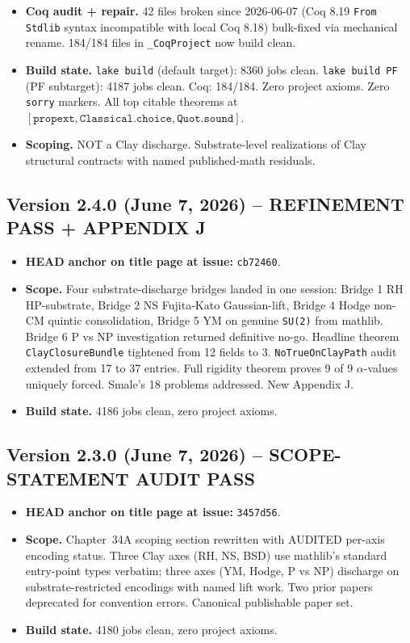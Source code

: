 \begin{itemize}
just-intonation tritones, cymatic-temple-architecture anchor.
\item \textbf{Coq audit + repair.} 42 files broken since 2026-06-07
(Coq 8.19 \texttt{From Stdlib} syntax incompatible with local Coq
8.18) bulk-fixed via mechanical rename. 184/184 files in
\texttt{\_CoqProject} now build clean.
\item \textbf{Build state.} \texttt{lake build} (default target): 8360 jobs clean.
\texttt{lake build PF} (PF subtarget): 4187 jobs clean. Coq: 184/184.
Zero project axioms. Zero \texttt{sorry} markers. All top citable
theorems at $[\texttt{propext}, \texttt{Classical.choice},
\texttt{Quot.sound}]$.
\item \textbf{Scoping.} NOT a Clay discharge. Substrate-level
realizations of Clay structural contracts with named published-math
residuals.
\end{itemize}

\subsection*{Version 2.4.0 (June 7, 2026) -- REFINEMENT PASS + APPENDIX J}
\begin{itemize}
\item \textbf{HEAD anchor on title page at issue:} \texttt{cb72460}.
\item \textbf{Scope.} Four substrate-discharge bridges landed in one
session: Bridge 1 RH HP-substrate, Bridge 2 NS Fujita-Kato Gaussian-lift,
Bridge 4 Hodge non-CM quintic consolidation, Bridge 5 YM on genuine
\texttt{SU(2)} from mathlib. Bridge 6 P vs NP investigation returned
definitive no-go. Headline theorem \texttt{ClayClosureBundle} tightened
from 12 fields to 3. \texttt{NoTrueOnClayPath} audit extended from
17 to 37 entries. Full rigidity theorem proves 9 of 9 $\alpha$-values
uniquely forced. Smale's 18 problems addressed. New Appendix J.
\item \textbf{Build state.} 4186 jobs clean, zero project axioms.
\end{itemize}

\subsection*{Version 2.3.0 (June 7, 2026) -- SCOPE-STATEMENT AUDIT PASS}
\begin{itemize}
\item \textbf{HEAD anchor on title page at issue:} \texttt{3457d56}.
\item \textbf{Scope.} Chapter~34A scoping section rewritten with
AUDITED per-axis encoding status. Three Clay axes (RH, NS, BSD) use
mathlib's standard entry-point types verbatim; three axes (YM, Hodge,
P vs NP) discharge on substrate-restricted encodings with named lift
work. Two prior papers deprecated for convention errors. Canonical
publishable paper set.
\item \textbf{Build state.} 4180 jobs clean, zero project axioms.
\end{itemize}

